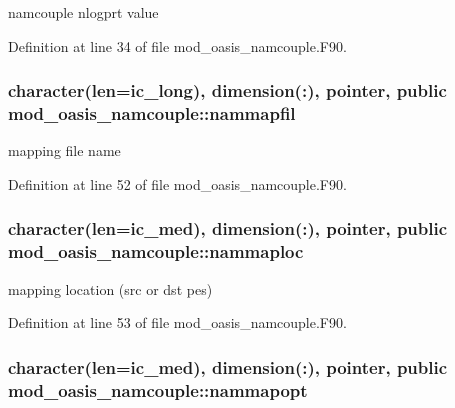 namcouple nlogprt value 



Definition at line 34 of file mod\+\_\+oasis\+\_\+namcouple.\+F90.

\hypertarget{classmod__oasis__namcouple_a9fc6ac674a8cfa68d9d15ad13213e21d}{
\subsubsection[{nammapfil}]{\setlength{\rightskip}{0pt plus 5cm}character(len=ic\+\_\+long), dimension(\+:), pointer, public mod\+\_\+oasis\+\_\+namcouple\+::nammapfil}}\label{classmod__oasis__namcouple_a9fc6ac674a8cfa68d9d15ad13213e21d}


mapping file name 



Definition at line 52 of file mod\+\_\+oasis\+\_\+namcouple.\+F90.

\hypertarget{classmod__oasis__namcouple_a7316d7d322da7cf10f315e38c145ebbb}{
\subsubsection[{nammaploc}]{\setlength{\rightskip}{0pt plus 5cm}character(len=ic\+\_\+med), dimension(\+:), pointer, public mod\+\_\+oasis\+\_\+namcouple\+::nammaploc}}\label{classmod__oasis__namcouple_a7316d7d322da7cf10f315e38c145ebbb}


mapping location (src or dst pes) 



Definition at line 53 of file mod\+\_\+oasis\+\_\+namcouple.\+F90.

\hypertarget{classmod__oasis__namcouple_ad2554b4881fa63780dd5e6fe78d705ef}{
\subsubsection[{nammapopt}]{\setlength{\rightskip}{0pt plus 5cm}character(len=ic\+\_\+med), dimension(\+:), pointer, public mod\+\_\+oasis\+\_\+namcouple\+::nammapopt}}\label{classmod__oasis__namcouple_ad2554b4881fa63780dd5e6fe78d705ef}


